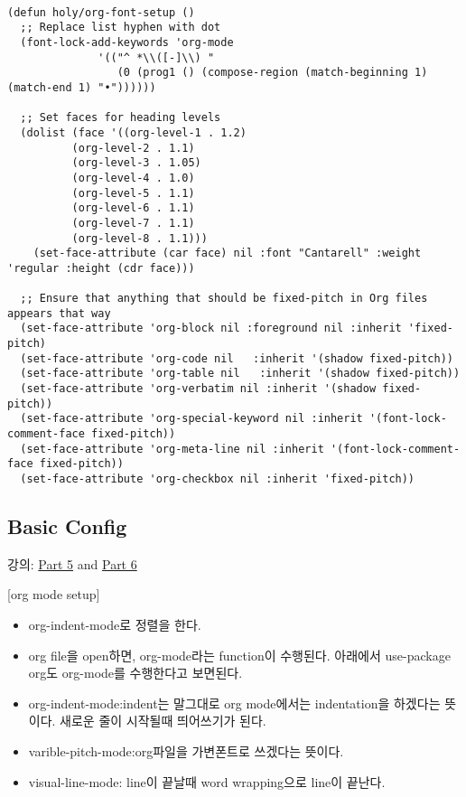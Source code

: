 \documentclass[11pt]{article}
\begin{document}
\begin{verbatim}

(defun holy/org-font-setup ()
  ;; Replace list hyphen with dot
  (font-lock-add-keywords 'org-mode
			  '(("^ *\\([-]\\) "
			     (0 (prog1 () (compose-region (match-beginning 1) (match-end 1) "•"))))))

  ;; Set faces for heading levels
  (dolist (face '((org-level-1 . 1.2)
		  (org-level-2 . 1.1)
		  (org-level-3 . 1.05)
		  (org-level-4 . 1.0)
		  (org-level-5 . 1.1)
		  (org-level-6 . 1.1)
		  (org-level-7 . 1.1)
		  (org-level-8 . 1.1)))
    (set-face-attribute (car face) nil :font "Cantarell" :weight 'regular :height (cdr face)))

  ;; Ensure that anything that should be fixed-pitch in Org files appears that way
  (set-face-attribute 'org-block nil :foreground nil :inherit 'fixed-pitch)
  (set-face-attribute 'org-code nil   :inherit '(shadow fixed-pitch))
  (set-face-attribute 'org-table nil   :inherit '(shadow fixed-pitch))
  (set-face-attribute 'org-verbatim nil :inherit '(shadow fixed-pitch))
  (set-face-attribute 'org-special-keyword nil :inherit '(font-lock-comment-face fixed-pitch))
  (set-face-attribute 'org-meta-line nil :inherit '(font-lock-comment-face fixed-pitch))
  (set-face-attribute 'org-checkbox nil :inherit 'fixed-pitch))

\end{verbatim}

\subsection*{Basic Config}
\label{sec:org63c2b96}
강의: \href{https://youtu.be/VcgjTEa0kU4}{Part 5} and \href{https://youtu.be/PNE-mgkZ6HM}{Part 6} 

[org mode setup]

\begin{itemize}
\item org-indent-mode로 정렬을 한다.
\item org file을 open하면, org-mode라는 function이 수행된다.  아래에서 use-package org도 org-mode를 수행한다고 보면된다.
\item org-indent-mode:indent는 말그대로 org mode에서는 indentation을 하겠다는 뜻이다. 새로운 줄이 시작될때 띄어쓰기가 된다.
\item varible-pitch-mode:org파일을 가변폰트로 쓰겠다는 뜻이다.
\item visual-line-mode: line이 끝날때 word wrapping으로 line이 끝난다.
\end{itemize}
\end{document}
